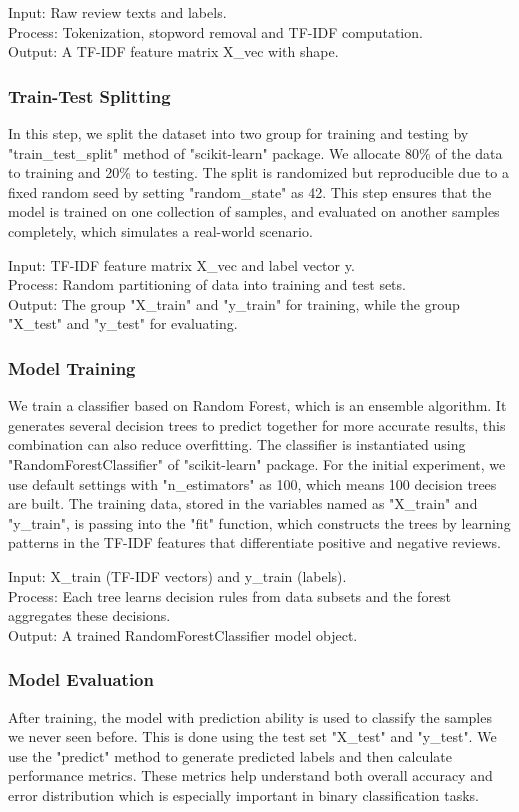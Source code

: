 Input: Raw review texts and labels.\\
Process: Tokenization, stopword removal and TF-IDF computation.\\
Output: A TF-IDF feature matrix X\_vec with shape.

\subsubsection{Train-Test Splitting}
In this step, we split the dataset into two group for training and testing by "train\_test\_split" method of "scikit-learn" package. We allocate 80\% of the data to training and 20\% to testing. The split is randomized but reproducible due to a fixed random seed by setting "random\_state" as 42.
This step ensures that the model is trained on one collection of samples, and evaluated on another samples completely, which simulates a real-world scenario.

Input: TF-IDF feature matrix X\_vec and label vector y. \\
Process: Random partitioning of data into training and test sets. \\
Output: The group "X\_train" and "y\_train" for training, while the group "X\_test" and "y\_test" for evaluating.

\subsubsection{Model Training}
We train a classifier based on Random Forest, which is an ensemble algorithm. It generates several decision trees to predict together for more accurate results, this combination can also reduce overfitting. The classifier is instantiated using "RandomForestClassifier" of "scikit-learn" package. For the initial experiment, we use default settings with "n\_estimators" as 100, which means 100 decision trees are built. The training data, stored in the variables named as "X\_train" and "y\_train", is passing into the "fit" function, which constructs the trees by learning patterns in the TF-IDF features that differentiate positive and negative reviews.

Input: X\_train (TF-IDF vectors) and y\_train (labels). \\
Process: Each tree learns decision rules from data subsets and the forest aggregates these decisions.\\
Output: A trained RandomForestClassifier model object.

\subsubsection{Model Evaluation}
After training, the model with prediction ability is used to classify the samples we never seen before. This is done using the test set "X\_test" and "y\_test". We use the "predict" method to generate predicted labels and then calculate performance metrics. These metrics help understand both overall accuracy and error distribution which is especially important in binary classification tasks.

